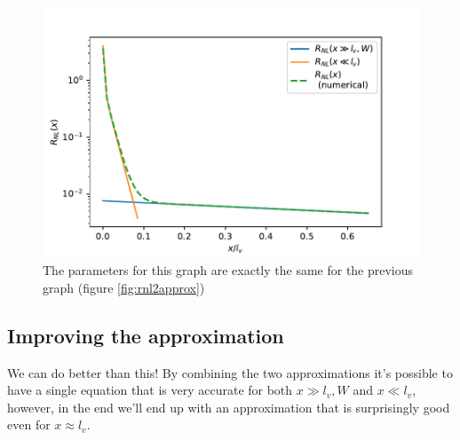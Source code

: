\begin{figure}[h!]
    \centering
    \includegraphics[width=\linewidth]{Immagini/rnl/x2approx.pdf}
    \caption{The parameters for this graph are exactly the same for the previous graph (figure \ref{fig:rnl2approx})}
    \label{fig:rnlx2approx}
\end{figure}
\subsection{Improving the approximation}
We can do better than this! By combining the two approximations it's possible to have a single equation that is very accurate for both $x\gg l_v,W$ and $x\ll l_v$, however, in the end we'll end up with an approximation that is surprisingly good even for  $x\approx l_v$.


